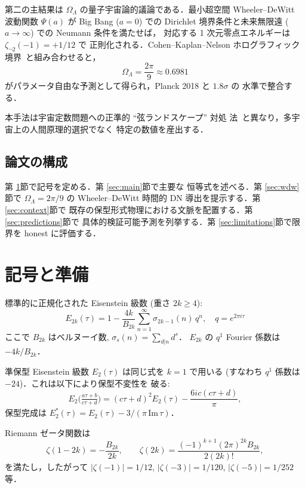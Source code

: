 \documentclass[11pt,a4paper]{article}
\begin{document}
第二の主結果は $\Omega_\Lambda$ の量子宇宙論的議論である．最小超空間
Wheeler--DeWitt 波動関数 $\Psi(a)$ が Big Bang ($a = 0$) での Dirichlet
境界条件と未来無限遠 ($a \to \infty$) での Neumann 条件を満たせば，
対応する 1 次元零点エネルギーは $\zeta_{\neg 2}(-1) = +1/12$ で
正則化される．Cohen--Kaplan--Nelson ホログラフィック
境界~\cite{CKN1999}と組み合わせると，
\begin{equation}
\Omega_\Lambda = \frac{2\pi}{9} \approx 0.6981
\end{equation}
がパラメータ自由な予測として得られ，Planck 2018 と $1.8\sigma$ の
水準で整合する．

本手法は宇宙定数問題への正準的 ``弦ランドスケープ'' 対処
法~\cite{Susskind2003}と異なり，多宇宙上の人間原理的選択でなく
特定の数値を産出する．

\subsection{論文の構成}

第 \ref{sec:notation}節で記号を定める．第 \ref{sec:main}節で主要な
恒等式を述べる．第 \ref{sec:wdw}節で $\Omega_\Lambda = 2\pi/9$ の
Wheeler--DeWitt 時間的 DN 導出を提示する．第 \ref{sec:context}節で
既存の保型形式物理における文脈を配置する．第 \ref{sec:predictions}節で
具体的検証可能予測を列挙する．第 \ref{sec:limitations}節で限界を
honest に評価する．

\section{記号と準備}
\label{sec:notation}

標準的に正規化された Eisenstein 級数 (重さ $2k \geq 4$):
\begin{equation}
E_{2k}(\tau) = 1 - \frac{4k}{B_{2k}}\sum_{n=1}^\infty \sigma_{2k-1}(n)\,q^n,
\quad q = e^{2\pi i\tau}
\end{equation}
ここで $B_{2k}$ はベルヌーイ数, $\sigma_s(n) = \sum_{d|n}d^s$．
$E_{2k}$ の $q^1$ Fourier 係数は $-4k/B_{2k}$．

準保型 Eisenstein 級数 $E_2(\tau)$ は同じ式を $k=1$ で用いる
(すなわち $q^1$ 係数は $-24$)．これは以下により保型不変性を
破る:
\begin{equation}
E_2\bigl(\tfrac{a\tau+b}{c\tau+d}\bigr) = (c\tau+d)^2 E_2(\tau) - \frac{6ic(c\tau+d)}{\pi},
\end{equation}
保型完成は $E_2^*(\tau) = E_2(\tau) - 3/(\pi\,\mathrm{Im}\,\tau)$．

Riemann ゼータ関数は
\begin{equation}
\zeta(1-2k) = -\frac{B_{2k}}{2k}, \qquad \zeta(2k) = \frac{(-1)^{k+1}(2\pi)^{2k}B_{2k}}{2(2k)!},
\end{equation}
を満たし，したがって $|\zeta(-1)| = 1/12$, $|\zeta(-3)| = 1/120$,
$|\zeta(-5)| = 1/252$ 等．
\end{document}
